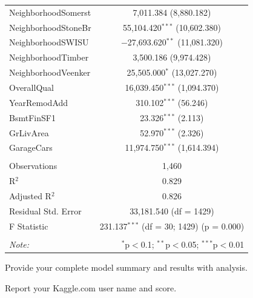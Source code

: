 \documentclass[]{article}
\begin{document}
\begin{table}[!htbp]
\begin{tabular}{@{\extracolsep{5pt}}lc}
  NeighborhoodSomerst & 7,011.384 (8,880.182) \\ 
  NeighborhoodStoneBr & 55,104.420$^{***}$ (10,602.380) \\ 
  NeighborhoodSWISU & $-$27,693.620$^{**}$ (11,081.320) \\ 
  NeighborhoodTimber & 3,500.186 (9,974.428) \\ 
  NeighborhoodVeenker & 25,505.000$^{*}$ (13,027.270) \\ 
  OverallQual & 16,039.450$^{***}$ (1,094.370) \\ 
  YearRemodAdd & 310.102$^{***}$ (56.246) \\ 
  BsmtFinSF1 & 23.326$^{***}$ (2.113) \\ 
  GrLivArea & 52.970$^{***}$ (2.326) \\ 
  GarageCars & 11,974.750$^{***}$ (1,614.394) \\ 
 \hline \\[-1.8ex] 
Observations & 1,460 \\ 
R$^{2}$ & 0.829 \\ 
Adjusted R$^{2}$ & 0.826 \\ 
Residual Std. Error & 33,181.540 (df = 1429) \\ 
F Statistic & 231.137$^{***}$ (df = 30; 1429)  (p = 0.000) \\ 
\hline 
\hline \\[-1.8ex] 
\textit{Note:}  & \multicolumn{1}{r}{$^{*}$p$<$0.1; $^{**}$p$<$0.05; $^{***}$p$<$0.01} \\ 
\end{tabular} 
\end{table}

Provide your complete model summary and results with analysis.

Report your Kaggle.com user name and score.
\end{document}
